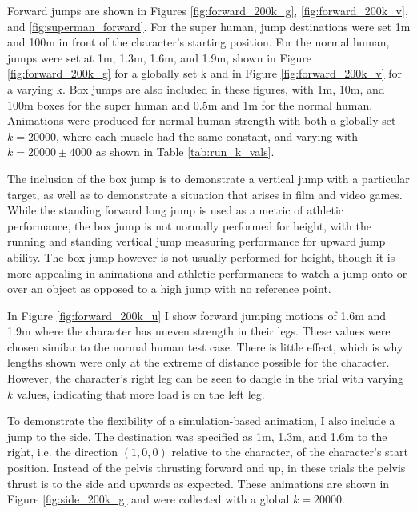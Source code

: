Forward jumps are shown in Figures \ref{fig:forward_200k_g}, \ref{fig:forward_200k_v}, and \ref{fig:superman_forward}. For the super human, jump destinations were set 1m and 100m in front of the character's starting position.  For the normal human, jumps were set at 1m, 1.3m, 1.6m, and 1.9m, shown in Figure \ref{fig:forward_200k_g} for a globally set k and in Figure \ref{fig:forward_200k_v} for a varying k.  Box jumps are also included in these figures, with 1m, 10m, and 100m boxes for the super human and 0.5m and 1m for the normal human.  Animations were produced for normal human strength with both a globally set $k=20000$, where each muscle had the same constant, and varying with $k=20000\pm 4000$ as shown in Table \ref{tab:run_k_vals}. 

The inclusion of the box jump is to demonstrate a vertical jump with a particular target, as well as to demonstrate a situation that arises in film and video games.  While the standing forward long jump is used as a metric of athletic performance, the box jump is not normally performed for height, with the running and standing vertical jump measuring performance for upward jump ability.  The box jump however is not usually performed for height, though it is more appealing in animations and athletic performances to watch a jump onto or over an object as opposed to a high jump with no reference point.

In Figure \ref{fig:forward_200k_u} I show forward jumping motions of 1.6m and 1.9m where the character has uneven strength in their legs.  These values were chosen similar to the normal human test case.  There is little effect, which is why lengths shown were only at the extreme of distance possible for the character.  However, the character's right leg can be seen to dangle in the trial with varying $k$ values, indicating that more load is on the left leg.

To demonstrate the flexibility of a simulation-based animation, I also include a jump to the side.  The destination was specified as 1m, 1.3m, and 1.6m to the right, i.e. the direction $(1, 0, 0)$ relative to the character, of the character's start position.  Instead of the pelvis thrusting forward and up, in these trials the pelvis thrust is to the side and upwards as expected.  These animations are shown in Figure \ref{fig:side_200k_g} and were collected with a global $k=20000$.

\newcommand{\floatedfig}[1]{\begin{subfigure}[h]{0.12\textwidth}\vspace{1mm}\texttt{[image: \#1]}\vspace{1mm}\end{subfigure}\hspace{0.025\textwidth}}
\newcommand{\floatedfigsz}[2]{\begin{subfigure}[h]{#2\textwidth}\vspace{1mm}\texttt{[image: \#1]}\vspace{1mm}\end{subfigure}\hspace{0.025\textwidth}}
\newcommand{\framesubfig}[1]{\begin{subfigure}[h]{0.15\textwidth}\texttt{[image: \#1]}\end{subfigure}}

